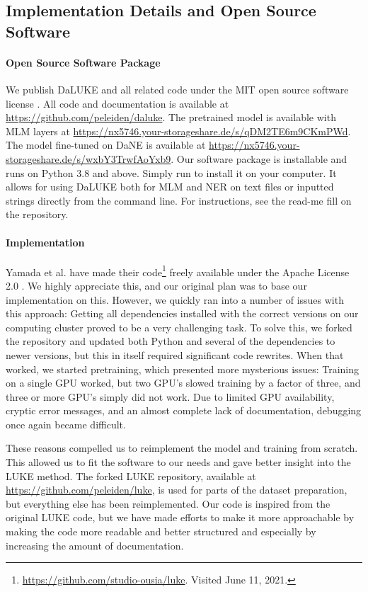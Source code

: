 \documentclass[main.tex]{subfiles}
\begin{document}
\subsection{Implementation Details and Open Source Software}%
\label{sub:oss}

\paragraph{Open Source Software Package}
We publish DaLUKE and all related code under the MIT open source software license \cite{mitlicense}.
All code and documentation is available at \url{https://github.com/peleiden/daluke}.
The pretrained model is available with MLM layers at \url{https://nx5746.your-storageshare.de/s/qDM2TE6m9CKmPWd}.
The model fine-tuned on DaNE is available at \url{https://nx5746.your-storageshare.de/s/wxbY3TrwfAoYxb9}.
Our software package is  installable and runs on Python 3.8 and above.
Simply run  to install it on your computer.
It allows for using DaLUKE both for MLM and NER on text files or inputted strings directly from the command line.
For instructions, see the read-me fill on the repository.

\paragraph{Implementation}
Yamada et al. have made their code\footnote{\url{https://github.com/studio-ousia/luke}. Visited June 11, 2021.} freely available under the Apache License 2.0 \cite{apachelicense}.
We highly appreciate this, and our original plan was to base our implementation on this.
However, we quickly ran into a number of issues with this approach:
Getting all dependencies installed with the correct versions on our computing cluster proved to be a very challenging task.
To solve this, we forked the repository and updated both Python and several of the dependencies to newer versions, but this in itself required significant code rewrites.
When that worked, we started pretraining, which presented more mysterious issues:
Training on a single GPU worked, but two GPU's slowed training by a factor of three, and three or more GPU's simply did not work.
Due to limited GPU availability, cryptic error messages, and an almost complete lack of documentation, debugging once again became difficult.

These reasons compelled us to reimplement the model and training from scratch.
This allowed us to fit the software to our needs and gave better insight into the LUKE method.
The forked LUKE repository, available at \url{https://github.com/peleiden/luke}, is used for parts of the dataset preparation, but everything else has been reimplemented.
Our code is inspired from the original LUKE code, but we have made efforts to make it more approachable by making the code more readable and better structured and especially by increasing the amount of documentation.
\end{document}
